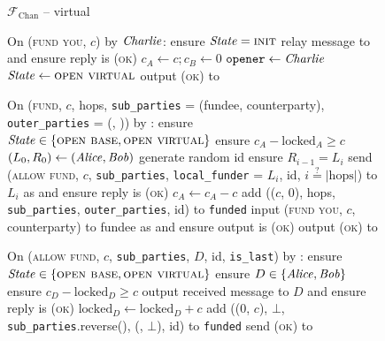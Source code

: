 \begin{figure}[H]
  \begin{systembox}{$\mathcal{F}_{\mathrm{Chan}}$ -- virtual}
    \begin{algorithmic}[1]
      \State On (\textsc{fund you}, $c$) by $\mathit{Charlie}$:
      \Indent
        \State ensure $\mathit{State} = \textsc{init}$
        \State relay message to \adversary and ensure reply is \textsc{(ok)}
        \State $c_A \gets c; c_B \gets 0$
        \State $\mathtt{opener} \gets \mathit{Charlie}$
        \State $\mathit{State} \gets \textsc{open virtual}$
        \State output (\textsc{ok}) to \charlie
      \EndIndent
      \Statex

      \State On (\textsc{fund}, $c$, hops, \texttt{sub\_parties} = (fundee,
      counterparty), \texttt{outer\_parties} = (\charlie, \dave)) by \alice:
      \Indent
        \State ensure $\mathit{State} \in \{\textsc{open base}, \textsc{open
        virtual}\}$
        \State ensure $c_A - \mathrm{locked}_A \geq c$
        \State $(L_0, R_0) \gets (\mathit{Alice}, \mathit{Bob})$
        \State generate random id
         
          \State ensure $R_{i-1} = L_i$
          \State send (\textsc{allow fund}, $c$, \texttt{sub\_parties},
          \texttt{local\_funder} = $L_i$, id, $i \overset{?}{=} |\mathrm{hops}|$)
          to $L_i$ as \alice and ensure reply is (\textsc{ok})
        \EndFor
        \State $c_A \gets c_A - c$
        \State add (($c$, 0), hops, \texttt{sub\_parties},
        \texttt{outer\_parties}, id) to \texttt{funded} 
        \State input (\textsc{fund you}, $c$, counterparty) to fundee as \alice
        and ensure output is (\textsc{ok})
        \State output (\textsc{ok}) to \alice
      \EndIndent
      \Statex

      \State On (\textsc{allow fund}, $c$, \texttt{sub\_parties}, $D$, id,
      \texttt{is\_last}) by \charlie:
      \Indent
        \State ensure $\mathit{State} \in \{\textsc{open base}, \textsc{open
        virtual}\}$
        \State ensure $D \in \{\mathit{Alice}, \mathit{Bob}\}$
        \State ensure $c_D - \mathrm{locked}_D \geq c$
        \State output received message to $D$ and ensure reply is \textsc{(ok)}
        \State $\mathrm{locked}_D \gets \mathrm{locked}_D + c$
          \State add ((0, $c$), $\bot$, \texttt{sub\_parties}.reverse(),
          (\dave, $\bot$), id) to \texttt{funded}
        \EndIf
        \State send (\textsc{ok}) to \charlie
      \EndIndent
    \end{algorithmic}
  \end{systembox}
  \caption{}
  \label{code:functionality:chan:skeleton:virtual}
\end{figure}

